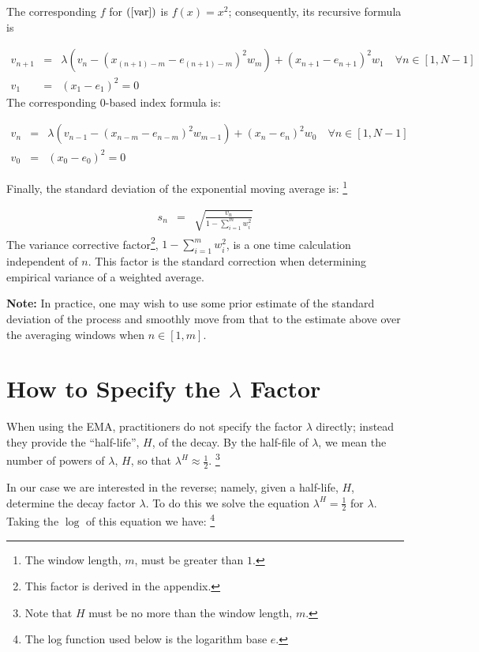 \documentclass{article}
\begin{document}
The corresponding $f$ for $(\ref{var})$ is $f(x) = x^2$; 
consequently, its recursive formula is 

\begin{eqnarray}
    v_{n+1} &=& \lambda \left( v_n -  ( x_{(n+1)-m} - e_{(n+1)-m} )^2 w_m \right) + ( x_{n+1} - e_{n+1} )^2 w_1 \quad \forall n \in [1, N-1] \\
    v_1     &=&  (x_1 - e_1)^2 = 0 
\end{eqnarray}
The corresponding 0-based index formula is:

\begin{eqnarray}
    v_{n} &=& \lambda \left( v_{n-1} - ( x_{n-m} - e_{n-m} )^2 w_{m-1}\right) + ( x_{n} - e_{n} )^2 w_0 \quad \forall n \in [1, N-1] \\
    v_0   &=& (x_0 - e_0)^2 = 0 
\end{eqnarray}

Finally, the standard deviation of the exponential moving average is:%
\footnote{The window length, $m$, must be greater than $1$.}

\begin{eqnarray}
    s_{n} &=& \sqrt{\frac{v_n}{1 - \sum_{i=1}^m w_i^2}}  
\end{eqnarray}
The variance corrective factor\footnote{This factor is derived in the appendix.}, $1 - \sum_{i=1}^m w_i^2$,
is a one time calculation independent of $n$. This factor is the standard 
correction when determining empirical variance of a weighted average.

{\bf Note:\/} In practice, one may wish to use some prior estimate of the standard deviation of the process
and smoothly move from that to the estimate above over the averaging windows when $n \in [1, m]$.


\section{How to Specify the $\lambda$ Factor}
When using the EMA, practitioners do not specify the factor $\lambda$ directly; 
instead they provide the ``half-life'', $H$,  of the decay.
By the half-file of $\lambda$, we mean the number of powers of $\lambda$, $H$, so that
$\lambda^H \approx \frac{1}{2}$.%
\footnote{Note that $H$ must be no more than the window length, $m$.} 

In our case we are interested in the reverse; namely, given a half-life, $H$, 
determine the decay factor $\lambda$. To do this we solve the equation $\lambda^H = \frac{1}{2}$
for $\lambda$.
Taking the $\log$ of this equation we have:%
\footnote{The log function used below is the logarithm base $e$.}
\end{document}
